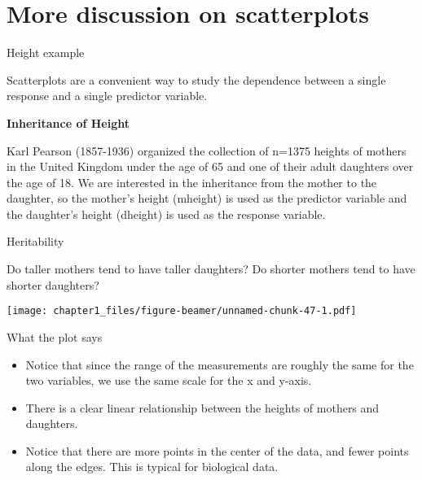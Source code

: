 \hypertarget{more-discussion-on-scatterplots}{%
\section{More discussion on
scatterplots}\label{more-discussion-on-scatterplots}}

\begin{frame}{Height example}
\protect\hypertarget{height-example}{}

Scatterplots are a convenient way to study the dependence between a
single response and a single predictor variable.

\textbf{Inheritance of Height}

Karl Pearson (1857-1936) organized the collection of n=1375 heights of
mothers in the United Kingdom under the age of 65 and one of their adult
daughters over the age of 18. We are interested in the inheritance from
the mother to the daughter, so the mother's height (mheight) is used as
the predictor variable and the daughter's height (dheight) is used as
the response variable.

\end{frame}

\begin{frame}{Heritability}
\protect\hypertarget{heritability}{}

Do taller mothers tend to have taller daughters? Do shorter mothers tend
to have shorter daughters?

\texttt{[image: chapter1\_files/figure-beamer/unnamed-chunk-47-1.pdf]}

\end{frame}

\begin{frame}{What the plot says}
\protect\hypertarget{what-the-plot-says}{}

\begin{itemize}
\item
  Notice that since the range of the measurements are roughly the same
  for the two variables, we use the same scale for the x and y-axis.
\item
  There is a clear linear relationship between the heights of mothers
  and daughters.
\item
  Notice that there are more points in the center of the data, and fewer
  points along the edges. This is typical for biological data.
\end{itemize}

\end{frame}

